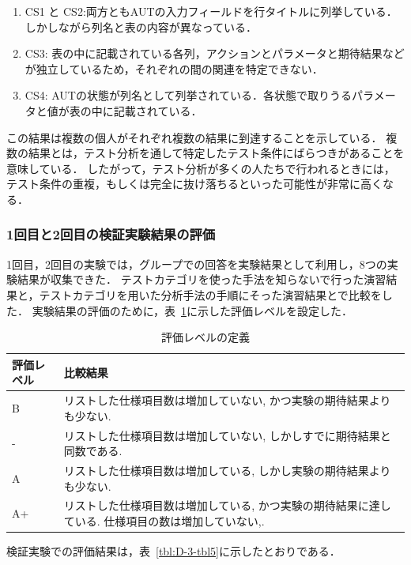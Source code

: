 \documentclass[10pt,a4j]{jarticle}
\begin{document}
\begin{enumerate}
\item CS1 と CS2:両方ともAUTの入力フィールドを行タイトルに列挙している．しかしながら列名と表の内容が異なっている．
\item CS3: 表の中に記載されている各列，アクションとパラメータと期待結果などが独立しているため，それぞれの間の関連を特定できない．
\item CS4: AUTの状態が列名として列挙されている．各状態で取りうるパラメータと値が表の中に記載されている．
\end{enumerate}
この結果は複数の個人がそれぞれ複数の結果に到達することを示している．
複数の結果とは，テスト分析を通して特定したテスト条件にばらつきがあることを意味している．
したがって，テスト分析が多くの人たちで行われるときには，テスト条件の重複，もしくは完全に抜け落ちるといった可能性が非常に高くなる．
\subsubsection{1回目と2回目の検証実験結果の評価}
1回目，2回目の実験では，グループでの回答を実験結果として利用し，8つの実験結果が収集できた．
テストカテゴリを使った手法を知らないで行った演習結果と，テストカテゴリを用いた分析手法の手順にそった演習結果とで比較をした．
実験結果の評価のために，表~\ref{tbl:D-3-tbl4}に示した評価レベルを設定した．
\begin{table}[htbp]
\footnotesize
  \centering
  \caption{評価レベルの定義}
    \begin{tabular}{|l|p{14em}|}
       \hline
    評価レベル & \multicolumn{1}{l|}{比較結果} \\
        \hline
     B    & リストした仕様項目数は増加していない, かつ実験の期待結果よりも少ない.  \\
        \hline
    -     & リストした仕様項目数は増加していない, しかしすでに期待結果と同数である.  \\
        \hline
    A     & リストした仕様項目数は増加している, しかし実験の期待結果よりも少ない.   \\
       \hline
    A+    & リストした仕様項目数は増加している, かつ実験の期待結果に達している. 仕様項目の数は増加していない,.  \\
        \hline
    \end{tabular}%
  \label{tbl:D-3-tbl4}%
\end{table}%
検証実験での評価結果は，表~\ref{tbl:D-3-tbl5}に示したとおりである．
\end{document}
